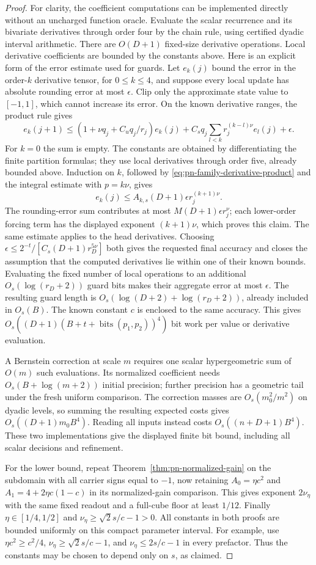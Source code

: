\begin{proof}
For clarity, the coefficient computations can be implemented
directly without an uncharged function oracle. Evaluate the
scalar recurrence and its bivariate derivatives through order
four by the chain rule, using certified dyadic interval arithmetic.
There are $O(D+1)$ fixed-size derivative operations. Local
derivative coefficients are bounded by the constants above.
Here is an explicit form of the error estimate used for guards.
Let $e_k(j)$ bound the error in the order-$k$ derivative tensor,
for $0\le k\le4$, and suppose every local update has absolute
rounding error at most $\epsilon$. Clip only the approximate
state value to $[-1,1]$, which cannot increase its error.
On the known derivative ranges, the product rule gives
\[
 e_k(j+1)\le(1+\nu q_j+C_uq_j/r_j)e_k(j)
 +C_s q_j\sum_{l<k}r_j^{(k-l)\nu}e_l(j)+\epsilon.
\]
For $k=0$ the sum is empty. The constants are obtained by
differentiating the finite partition formulas; they use local
derivatives through order five, already bounded above. Induction
on $k$, followed by \eqref{eq:pn-family-derivative-product} and
the integral estimate with $p=k\nu$, gives
\[
 e_k(j)\le A_{k,s}(D+1)\epsilon r_j^{(k+1)\nu}.
\]
The rounding-error sum contributes at most
$M(D+1)\epsilon r_j^\nu$; each lower-order forcing term has
the displayed exponent $(k+1)\nu$, which proves this claim.
The same estimate applies to the head derivatives. Choosing
$\epsilon\le2^{-t}/[C_s(D+1)r_D^{5\nu}]$ both gives the
requested final accuracy and closes the assumption that the
computed derivatives lie within one of their known bounds.
Evaluating the fixed number of local operations to an additional
$O_s(\log(r_D+2))$ guard bits makes their aggregate error at most
$\epsilon$. The resulting guard length is
$O_s(\log(D+2)+\log(r_D+2))$, already included in $O_s(B)$.
The known constant $c$ is enclosed to the same accuracy. This
gives $O_s((D+1)(B+t+\operatorname{bits}(p_1,p_2))^4)$
bit work per value or derivative evaluation.

A Bernstein correction at scale $m$ requires one scalar
hypergeometric sum of $O(m)$ such evaluations. Its normalized
coefficient needs $O_s(B+\log(m+2))$ initial precision; further
precision has a geometric tail under the fresh uniform comparison.
The correction masses are $O_s(m_0^2/m^2)$ on dyadic levels,
so summing the resulting expected costs gives
$O_s((D+1)m_0B^4)$. Reading all inputs instead costs
$O_s((n+D+1)B^4)$. These two implementations give the displayed
finite bit bound, including all scalar decisions and refinement.

For the lower bound, repeat
Theorem~\ref{thm:pn-normalized-gain} on the subdomain with all
carrier signs equal to $-1$, now retaining $A_0=\eta c^2$
and $A_1=4+2\eta c(1-c)$ in its normalized-gain comparison.
This gives exponent $2\nu_\eta$ with the same fixed readout
and a full-cube floor at least $1/12$.
Finally $\eta\in[1/4,1/2]$ and
$\nu_\eta\ge\sqrt2s/c-1>0$. All constants in both proofs
are bounded uniformly on this compact parameter interval.
For example, use $\eta c^2\ge c^2/4$,
$\nu_\eta\ge\sqrt2s/c-1$, and
$\nu_\eta\le2s/c-1$ in every prefactor. Thus the constants
may be chosen to depend only on $s$, as claimed.
\end{proof}
